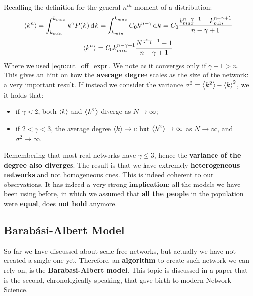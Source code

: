 \documentclass[../main/main.tex]{subfiles}
\begin{document}
Recalling the definition for the general \( n^{th} \) moment of a distribution: 
\begin{equation}
  \expval{k^n} = \int_{k_{min}}^{k_{max} } k^n P(k) \dd[]{k} = \int_{k_{min}}^{k_{max} }  C_0 k^{n- \gamma  }\dd[]{k} = C_0 \frac{k_{max}^{n -\gamma + 1}- k_{min}^{n -\gamma + 1}}{n -\gamma + 1} 
\end{equation}
\begin{equation}
\expval{k^n} = C_0 k_{min}^{n -\gamma + 1} \frac{N^{\frac{n}{\gamma-1} - 1} - 1}{n -\gamma + 1}
\end{equation}
Where we used \ref{eqn:cut_off_expr}. We note as it converges only if \( \gamma -1 > n  \). This gives an hint on how the \textbf{average degree} scales as the size of the network: a very important result. If instead we consider the variance \( \sigma ^2  = \expval{k^2} - \expval{k}^2  \), we it holds that:
\begin{itemize}
\item if \( \gamma <2  \), both \( \expval{k}  \) and \( \expval{k^2}  \) diverge as \( N \rightarrow  \infty  \);

\item if \( 2 < \gamma < 3  \), the average degree \( \expval{k}  \rightarrow c \) but \( \expval{k^2}  \rightarrow \infty \) as \( N \rightarrow  \infty  \), and \( \sigma ^2 \rightarrow \infty  \).
\end{itemize}
Remembering that most real networks have \( \gamma \le 3 \), hence the \textbf{variance of the degree also diverges}. The result is that we have extremely \textbf{heterogeneous networks} and not homogeneous ones. This is indeed coherent to our observations. 
It has indeed a very strong \textbf{implication}: all the models we have been using before, in which we assumed that \textbf{all the people} in the population were \textbf{equal}, does \textbf{not hold} anymore.





\subsection{Barabási-Albert Model}
So far we have discussed about scale-free networks, but actually we have not created a single one yet. Therefore, an \textbf{algorithm} to create such network we can rely on, is the \textbf{Barabasi-Albert model}. This topic is discussed in a paper that is the second, chronologically speaking, that gave birth to modern Network Science. 
\end{document}
